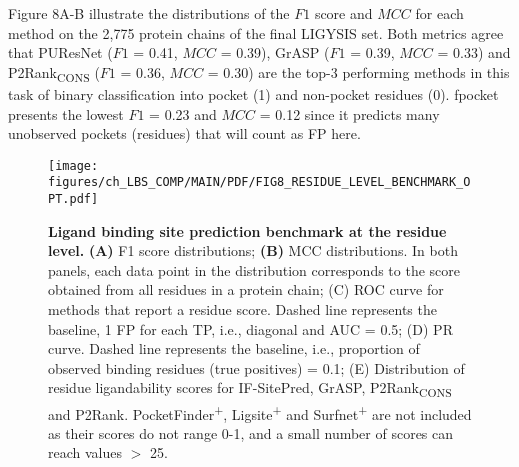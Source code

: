 Figure 8A-B illustrate the distributions of the $F1$ score and $MCC$ for each method on the 2,775 protein chains of the final LIGYSIS set. Both metrics agree that PUResNet ($F1$ = 0.41, $MCC$ = 0.39), GrASP ($F1$ = 0.39, $MCC$ = 0.33) and P2Rank\textsubscript{CONS} ($F1$ = 0.36, $MCC$ = 0.30) are the top-3 performing methods in this task of binary classification into pocket (1) and non-pocket residues (0). fpocket presents the lowest $F1$ = 0.23 and $MCC$ = 0.12 since it predicts many unobserved pockets (residues) that will count as FP here.

\begin{figure}[ht!]
    \centering
    \texttt{[image: figures/ch\_LBS\_COMP/MAIN/PDF/FIG8\_RESIDUE\_LEVEL\_BENCHMARK\_OPT.pdf]}
    \caption[Ligand binding site prediction benchmark at the residue level]{\textbf{Ligand binding site prediction benchmark at the residue level.} \textbf{(A)} F1 score distributions; \textbf{(B)} MCC distributions. In both panels, each data point in the distribution corresponds to the score obtained from all residues in a protein chain; (C) ROC curve for methods that report a residue score. Dashed line represents the baseline, 1 FP for each TP, i.e., diagonal and AUC = 0.5; (D) PR curve. Dashed line represents the baseline, i.e., proportion of observed binding residues (true positives) = 0.1; (E) Distribution of residue ligandability scores for IF-SitePred, GrASP, P2Rank\textsubscript{CONS} and P2Rank. PocketFinder\textsuperscript{+}, Ligsite\textsuperscript{+} and Surfnet\textsuperscript{+} are not included as their scores do not range 0-1, and a small number of scores can reach values $>$ 25.}
    \label{fig:residue_level_benchmark}
\end{figure}


